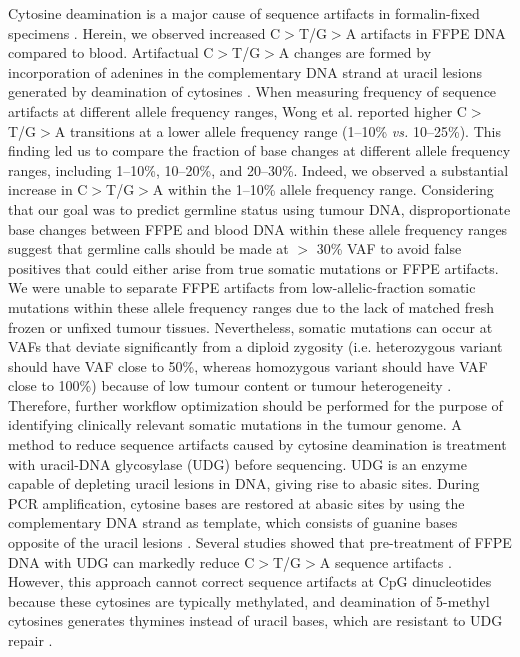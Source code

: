 Cytosine deamination is a major cause of sequence artifacts in formalin-fixed specimens \cite{Wong2014, Do2012, Oh2015, Spencer2013, Do2013, Kim2017, Chen2014}. Herein, we observed increased C$>$T/G$>$A artifacts in FFPE DNA compared to blood. Artifactual C$>$T/G$>$A changes are formed by incorporation of adenines in the complementary DNA strand at uracil lesions generated by deamination of cytosines \cite{Do2015a}. When measuring frequency of sequence artifacts at different allele frequency ranges, Wong et al. \cite{Wong2014} reported higher C$>$T/G$>$A transitions at a lower allele frequency range (1--10\% \textit{vs.} 10--25\%). This finding led us to compare the fraction of base changes at different allele frequency ranges, including 1--10\%, 10--20\%, and 20--30\%. Indeed, we observed a substantial increase in C$>$T/G$>$A within the 1--10\% allele frequency range. Considering that our goal was to predict germline status using tumour DNA, disproportionate base changes between FFPE and blood DNA within these allele frequency ranges suggest that germline calls should be made at $>$ 30\% VAF to avoid false positives that could either arise from true somatic mutations or FFPE artifacts. We were unable to separate FFPE artifacts from low-allelic-fraction somatic mutations within these allele frequency ranges due to the lack of matched fresh frozen or unfixed tumour tissues. Nevertheless, somatic mutations can occur at VAFs that deviate significantly from a diploid zygosity (i.e. heterozygous variant should have VAF close to 50\%, whereas homozygous variant should have VAF close to 100\%) because of low tumour content or tumour heterogeneity \cite{Kim2017a, Xu2017, Carrot-Zhang2016, Tian2015, Cai2016}. Therefore, further workflow optimization should be performed for the purpose of identifying clinically relevant somatic mutations in the tumour genome. A method to reduce sequence artifacts caused by cytosine deamination is treatment with uracil-DNA glycosylase (UDG) before sequencing. UDG is an enzyme capable of depleting uracil lesions in DNA, giving rise to abasic sites. During PCR amplification, cytosine bases are restored at abasic sites by using the complementary DNA strand as template, which consists of guanine bases opposite of the uracil lesions \cite{Do2015a}. Several studies showed that pre-treatment of FFPE DNA with UDG can markedly reduce C$>$T/G$>$A sequence artifacts \cite{Do2013, Kim2017, Do2012}. However, this approach cannot correct sequence artifacts at CpG dinucleotides because these cytosines are typically methylated, and deamination of 5-methyl cytosines generates thymines instead of uracil bases, which are resistant to UDG repair \cite{Do2013}.

